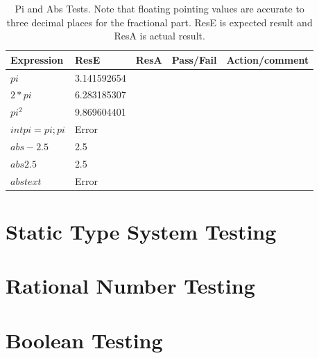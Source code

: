 \documentclass[a4paper, oneside, 11pt]{report}
\begin{document}
\begin{table}[h]
\centering
\caption{Pi and Abs Tests. Note that floating pointing values are accurate to three decimal places for the fractional part. ResE is expected result and ResA is actual result. \\}
\label{Table4}
\begin{tabular}{|l|l|l|l|l|} 
\hline
Expression       & ResE        & ResA & Pass/Fail & Action/comment  \\ 
\hline \hline
$pi$             & 3.141592654 &      &           &                 \\ 
\hline
$2*pi$           & 6.283185307 &      &           &                 \\ 
\hline
$pi^2$           & 9.869604401 &      &           &                 \\ 
\hline
$int pi = pi;pi$ & Error       &      &           &                 \\ 
\hline
$ abs -2.5 $   & 2.5         &      &           &                 \\ 
\hline
$ abs 2.5 $    & 2.5         &      &           &                 \\ 
\hline
$ abs text $   & Error       &      &           &                 \\
\hline
\end{tabular}
\end{table}

\section{Static Type System Testing}\label{StaticTest}
\section{Rational Number Testing}\label{RationTest}
\section{Boolean Testing}\label{BoolTest}
\end{document}
